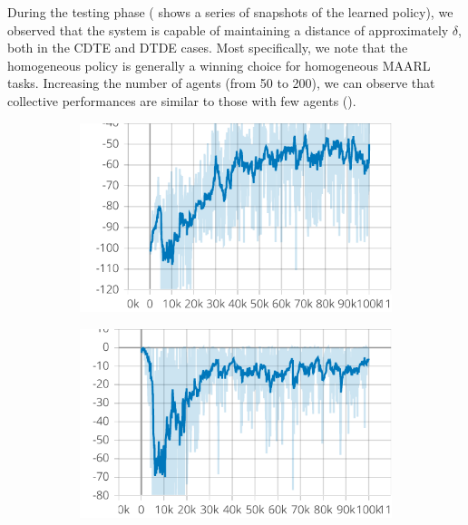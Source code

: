 During the testing phase 
 ( shows a series of snapshots of the learned policy), 
 we observed that the system is capable of maintaining a distance of approximately $\delta$, 
 both in the CDTE and DTDE cases. 
 Most specifically, 
 we note that the homogeneous policy is generally 
 a winning choice for homogeneous \ac{MAARL} tasks. 
%
Increasing the number of agents (from 50 to 200), 
 we can observe that collective performances are similar to those with few agents ().
\begin{figure}[t]
    \centering
    \begin{subfigure}[b]{0.32\textwidth}
        \centering
        \includegraphics[width=\textwidth]{papers/coordination2023/imgs/reward-ctde.pdf}
    \end{subfigure}
    \hfill
    \begin{subfigure}[b]{0.32\textwidth}
        \centering
        \includegraphics[width=\textwidth]{papers/coordination2023/imgs/collision-ctde.pdf}

\end{subfigure}
\end{figure}
